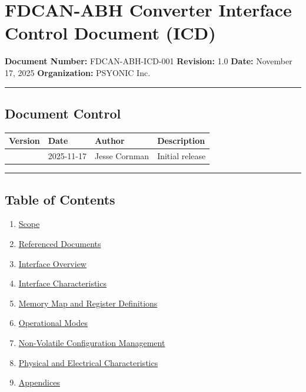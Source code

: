 \documentclass[
  11pt,
]{article}
\author{}
\date{}
\newcounter{none} %
\providecommand{\tightlist}{%
  \setlength{\itemsep}{0pt}\setlength{\parskip}{0pt}}
\begin{document}
\section{FDCAN-ABH Converter Interface Control Document
(ICD)}\label{fdcan-abh-converter-interface-control-document-icd}

\textbf{Document Number:} FDCAN-ABH-ICD-001 \textbf{Revision:} 1.0
\textbf{Date:} November 17, 2025 \textbf{Organization:} PSYONIC Inc.

\begin{center}\rule{0.5\linewidth}{0.5pt}\end{center}

\subsection{Document Control}\label{document-control}

{\def\LTcaptype{none} %
\begin{longtable}[]{@{}llll@{}}
\toprule\noalign{}
Version & Date & Author & Description \\
\midrule\noalign{}
\endhead
\bottomrule\noalign{}
\endlastfoot
1.0 & 2025-11-17 & Jesse Cornman & Initial release \\
\end{longtable}
}

\begin{center}\rule{0.5\linewidth}{0.5pt}\end{center}

\subsection{Table of Contents}\label{table-of-contents}

\begin{enumerate}
\def\labelenumi{\arabic{enumi}.}
\tightlist
\item
  \hyperref[1-scope]{Scope}
\item
  \hyperref[2-referenced-documents]{Referenced Documents}
\item
  \hyperref[3-interface-overview]{Interface Overview}
\item
  \hyperref[4-interface-characteristics]{Interface Characteristics}
\item
  \hyperref[5-memory-map-and-register-definitions]{Memory Map and
  Register Definitions}
\item
  \hyperref[6-operational-modes]{Operational Modes}
\item
  \hyperref[7-non-volatile-configuration-management]{Non-Volatile
  Configuration Management}
\item
  \hyperref[8-physical-and-electrical-characteristics]{Physical and
  Electrical Characteristics}
\item
  \hyperref[9-appendices]{Appendices}
\end{enumerate}
\end{document}

